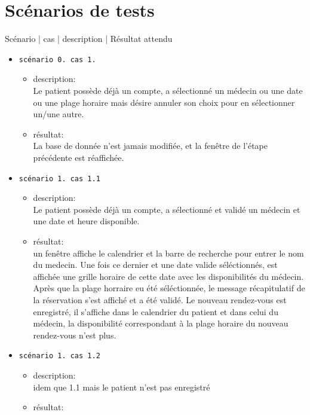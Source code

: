 	\section{Scénarios de tests}
	Scénario |   cas  |         description    |   Résultat attendu 

	\begin{itemize}
		\item[] \texttt{scénario 0. cas 1.} 
			\begin{itemize}
				\item description: \\
					Le patient possède déjà un compte, a sélectionné un médecin ou une date ou une
					plage horaire mais désire annuler son choix pour en sélectionner un/une autre.
				\item résultat:\\
					La base de donnée n’est jamais modifiée, et la fenêtre de l’étape précédente
					est réaffichée.\\
			\end{itemize}
		\item[] \texttt{scénario 1. cas 1.1}
			\begin{itemize}
				\item description:  \\
					Le patient possède déjà un compte, a sélectionné et validé
					un médecin et une date et heure disponible.
				\item résultat: \\
					un fenêtre affiche le calendrier et la barre de recherche
					pour entrer le nom du medecin. 
					Une fois ce dernier et une date valide séléctionnés, est
					affichée une grille horaire de cette date avec les
					disponibilités du médecin. Après que la plage horraire eu
					été séléctionnée, 
					le message récapitulatif de la réservation s’est affiché et
					a été validé. 
					Le nouveau rendez-vous est enregistré, il s’affiche dans le
					calendrier du patient et dans celui du médecin, la
					disponibilité correspondant à la plage horaire du nouveau
					rendez-vous n’est plus.\\
			\end{itemize}
		\item[] \texttt{scénario 1. cas 1.2}
			\begin{itemize}
				\item description:  \\
					idem que 1.1 mais le patient n’est pas enregistré
				\item résultat: \\

\end{itemize}
\end{itemize}
